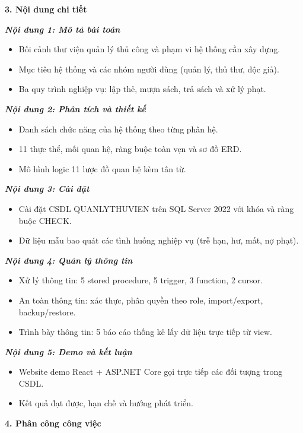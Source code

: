 \documentclass[13pt,a4paper,oneside]{extreport}
\begin{document}
\textbf{3. Nội dung chi tiết}

\textbf{\textit{Nội dung 1: Mô tả bài toán}}
\begin{itemize}[leftmargin=2.5em]
\item[+] Bối cảnh thư viện quản lý thủ công và phạm vi hệ thống cần xây dựng.
\item[+] Mục tiêu hệ thống và các nhóm người dùng (quản lý, thủ thư, độc giả).
\item[+] Ba quy trình nghiệp vụ: lập thẻ, mượn sách, trả sách và xử lý phạt.
\end{itemize}
\textbf{\textit{Nội dung 2: Phân tích và thiết kế}}
\begin{itemize}[leftmargin=2.5em]
\item[+] Danh sách chức năng của hệ thống theo từng phân hệ.
\item[+] 11 thực thể, mối quan hệ, ràng buộc toàn vẹn và sơ đồ ERD.
\item[+] Mô hình logic 11 lược đồ quan hệ kèm tân từ.
\end{itemize}
\textbf{\textit{Nội dung 3: Cài đặt}}
\begin{itemize}[leftmargin=2.5em]
\item[+] Cài đặt CSDL QUANLYTHUVIEN trên SQL Server 2022 với khóa và ràng buộc CHECK.
\item[+] Dữ liệu mẫu bao quát các tình huống nghiệp vụ (trễ hạn, hư, mất, nợ phạt).
\end{itemize}
\textbf{\textit{Nội dung 4: Quản lý thông tin}}
\begin{itemize}[leftmargin=2.5em]
\item[+] Xử lý thông tin: 5 stored procedure, 5 trigger, 3 function, 2 cursor.
\item[+] An toàn thông tin: xác thực, phân quyền theo role, import/export, backup/restore.
\item[+] Trình bày thông tin: 5 báo cáo thống kê lấy dữ liệu trực tiếp từ view.
\end{itemize}
\textbf{\textit{Nội dung 5: Demo và kết luận}}
\begin{itemize}[leftmargin=2.5em]
\item[+] Website demo React + ASP.NET Core gọi trực tiếp các đối tượng trong CSDL.
\item[+] Kết quả đạt được, hạn chế và hướng phát triển.
\end{itemize}

\textbf{4. Phân công công việc}
\end{document}
